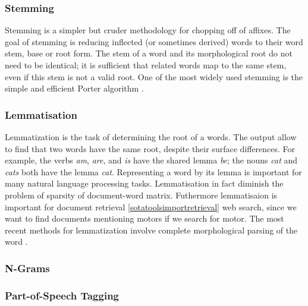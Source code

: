 \documentclass[]{book}
\begin{document}
\subsubsection{Stemming}\label{sotatoolstransformstemming}

Stemming is a simpler but cruder methodology for chopping off of
affixes. The goal of stemming is reducing inflected (or sometimes
derived) words to their word stem, base or root form. The stem of a word
and its morphological root do not need to be identical; it is sufficient
that related words map to the same stem, even if this stem is not a
valid root. One of the most widely used stemming is the simple and
efficient Porter algorithm \citep{porter1980algorithm}.

\subsubsection{Lemmatisation}\label{sotatoolstransformlemmatisation}

Lemmatization is the task of determining the root of a words. The output
allow to find that two words have the same root, despite their surface
differences. For example, the verbs \emph{am}, \emph{are}, and \emph{is}
have the shared lemma \emph{be}; the nouns \emph{cat} and \emph{cats}
both have the lemma \emph{cat}. Representing a word by its lemma is
important for many natural language processing tasks. Lemmatisation in
fact diminish the problem of sparsity of document-word matrix.
Futhermore lemmatisaion is important for document retrieval
\ref{sotatoolsimportretrieval} web search, since we want to find
documents mentioning motors if we search for motor. The most recent
methods for lemmatization involve complete morphological parsing of the
word \citep{hankamer1989morphological}.

\subsubsection{N-Grams}\label{sotatoolstransformngrams}

\subsubsection{Part-of-Speech Tagging}\label{sotatoolstransformpos}
\end{document}
